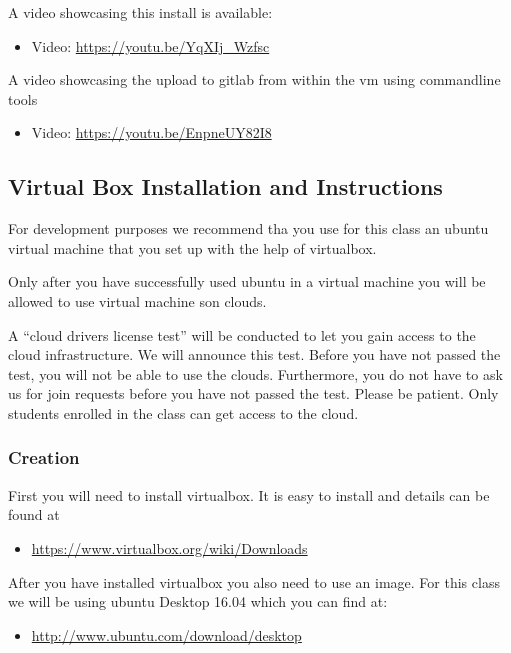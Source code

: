 A video showcasing this install is available:
\begin{itemize}
\item {} 
Video: \url{https://youtu.be/YqXIj\_Wzfsc}

\end{itemize}

A video showcasing the upload to gitlab from within the vm using
commandline tools
\begin{itemize}
\item {} 
Video: \url{https://youtu.be/EnpneUY82I8}

\end{itemize}


\subsection{Virtual Box Installation and Instructions}
\label{\detokenize{lesson/linux/virtualbox:winosxubuntuvm}}\label{\detokenize{lesson/linux/virtualbox::doc}}\label{\detokenize{lesson/linux/virtualbox:virtual-box-installation-and-instructions}}
For development purposes we recommend tha you use for this class an
ubuntu virtual machine that you set up with the help of virtualbox.

Only after you have successfully used ubuntu in a virtual machine you
will be allowed to use virtual machine son clouds.

A ``cloud drivers license test'' will be conducted to let you gain
access to the cloud infrastructure. We will announce this
test. Before you have not passed the test, you will not be able to use
the clouds. Furthermore, you do not have to ask us for join requests
before you have not passed the test. Please be patient. Only students
enrolled in the class can get access to the cloud.


\subsubsection{Creation}
\label{\detokenize{lesson/linux/virtualbox:creation}}
First you will need to install virtualbox. It is easy to install and
details can be found at
\begin{itemize}
\item {} 
\url{https://www.virtualbox.org/wiki/Downloads}

\end{itemize}

After you have installed virtualbox you also need to use an image. For
this class we will be using ubuntu Desktop 16.04 which you can find
at:
\begin{itemize}
\item {} 
\url{http://www.ubuntu.com/download/desktop}

\end{itemize}

